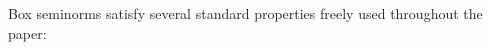 \documentclass[11pt]{amsart}
\theoremstyle{definition}
\DeclareMathOperator*{\E}{\mathbb{E}}
\newcommand{\N}{{\mathbb N}}
\newcommand{\Z}{{\mathbb Z}}
\renewcommand{\angle}[1]{\mathopen{}\left\langle #1\mathclose{}\right\rangle}
\newcommand{\nnorm}[1]{\lvert\!|\!| #1|\!|\!\rvert}
\newcommand{\1}{{\mathbf{1}}}
\begin{document}

Box seminorms satisfy several standard properties freely used throughout the paper: %
\end{document}
